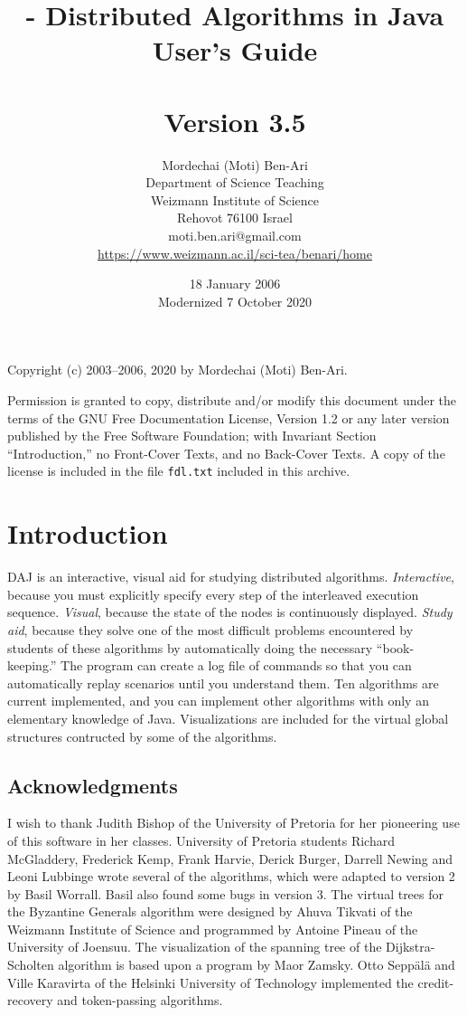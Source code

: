 \documentclass[11pt]{article}
\title{\daj{} - Distributed Algorithms in Java\\User's Guide\\\mbox{}\\\large{Version 3.5}}
\author{Mordechai (Moti) Ben-Ari\\
Department of Science Teaching\\
Weizmann Institute of Science\\
Rehovot 76100 Israel\\
\textsf{moti.ben.ari@gmail.com}\\
\url{https://www.weizmann.ac.il/sci-tea/benari/home}}
\date{18 January 2006\\\smallskip
Modernized 7 October 2020}
\newcommand{\daj}{\textsc{DAJ}}
\newcommand{\p}[1]{\texttt{#1}}
\begin{document}
\maketitle
\thispagestyle{empty}

\vfil

\begin{center}
Copyright (c) 2003--2006, 2020 by Mordechai (Moti) Ben-Ari.
\end{center}
Permission is granted to copy, distribute and/or modify this document
under the terms of the GNU Free Documentation License, Version 1.2
or any later version published by the Free Software Foundation;
with Invariant Section ``Introduction,'' no Front-Cover Texts, and no Back-Cover Texts.
A copy of the license is included in the file \p{fdl.txt}
included in this archive.
\vfil
\newpage

\section{Introduction}

\daj{} is an interactive, visual aid for studying distributed
algorithms. \emph{Interactive}, because you must explicitly
specify every step of the interleaved execution sequence.
\emph{Visual}, because the state of the nodes is continuously
displayed. \emph{Study aid}, because they solve one of the most
difficult problems encountered by students of these algorithms
by automatically doing the necessary ``book-keeping.'' The
program can create a log file of commands so that you can
automatically replay scenarios until you understand them. Ten
algorithms are current implemented,
and you can implement other algorithms with only
an elementary knowledge of Java.
Visualizations are included for the virtual global structures
contructed by some of the algorithms.

\subsection{Acknowledgments}
I wish to thank Judith Bishop of the University of Pretoria for
her pioneering use of this software in her classes. University
of Pretoria students Richard McGladdery, Frederick Kemp, Frank
Harvie, Derick Burger, Darrell Newing and Leoni Lubbinge wrote
several of the algorithms, which were adapted to version 2 by
Basil Worrall. Basil also found some bugs in version 3. The
virtual trees for the Byzantine Generals algorithm were designed
by Ahuva Tikvati of the Weizmann Institute of Science and
programmed by Antoine Pineau of the University of Joensuu. The
visualization of the spanning tree of the Dijkstra-Scholten
algorithm is based upon a program by Maor Zamsky.
Otto Sepp\"al\"a and Ville Karavirta of the Helsinki University
of Technology implemented the credit-recovery and token-passing
algorithms.
\end{document}
